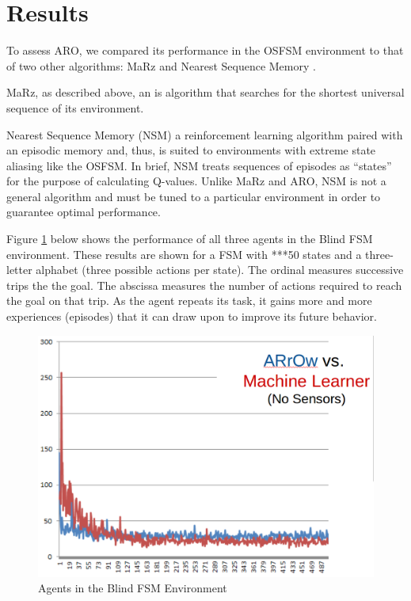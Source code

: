 \documentclass[letterpaper]{article} %
\begin{document}
\section{Results}

To assess ARO, we compared its performance in the OSFSM environment to
that of two other algorithms: MaRz \cite{Rodriguez17} and Nearest
Sequence Memory \cite{McCallum95}.

MaRz, as described above, an is algorithm that searches for the
shortest universal sequence of its environment.

Nearest Sequence Memory (NSM) a reinforcement learning algorithm
paired with an episodic memory and, thus, is suited to environments
with extreme state aliasing like the OSFSM.  In brief, NSM treats
sequences of episodes as ``states'' for the purpose of calculating
Q-values.  Unlike MaRz and ARO, NSM is not a general algorithm and
must be tuned to a particular environment in order to guarantee
optimal performance.

Figure \ref{fig4} below shows the performance of all three agents in
the Blind FSM environment.  These results are shown for a FSM with
***50 states and a three-letter alphabet (three possible actions per
state).  The ordinal measures successive trips the the goal.  The
abscissa measures the number of actions required to reach the goal on
that trip.  As the agent repeats its task, it gains more and more
experiences (episodes) that it can draw upon to improve its future
behavior.

\begin{figure}[t]
  \centering
  \includegraphics[width=0.9\columnwidth]{BFSMResult.png} %
  \caption{Agents in the Blind FSM Environment}
  \label{fig4}
\end{figure}
\end{document}
